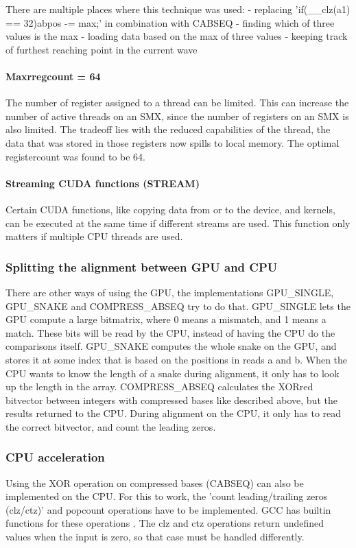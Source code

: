 \documentclass[../main/thesis.tex]{subfiles}
\begin{document}
There are multiple places where this technique was used:
- replacing 'if(\_\_clz(a1) == 32){abpos -= max;}' in combination with CABSEQ
- finding which of three values is the max
- loading data based on the max of three values
- keeping track of furthest reaching point in the current wave

\paragraph{Maxrregcount = 64}
The number of register assigned to a thread can be limited.
This can increase the number of active threads on an SMX, since the number of registers on an SMX is also limited.
The tradeoff lies with the reduced capabilities of the thread, the data that was stored in those registers now spills to local memory.
The optimal registercount was found to be 64.

\paragraph{Streaming CUDA functions (STREAM)}
Certain CUDA functions, like copying data from or to the device, and kernels, can be executed at the same time if different streams are used.
This function only matters if multiple CPU threads are used.

\subsubsection{Splitting the alignment between GPU and CPU}
There are other ways of using the GPU, the implementations GPU\_SINGLE, GPU\_SNAKE and COMPRESS\_ABSEQ try to do that.
GPU\_SINGLE lets the GPU compute a large bitmatrix, where 0 means a mismatch, and 1 means a match.
These bits will be read by the CPU, instead of having the CPU do the comparisons itself.
GPU\_SNAKE computes the whole snake on the GPU, and stores it at some index that is based on the positions in reads a and b.
When the CPU wants to know the length of a snake during alignment, it only has to look up the length in the array.
COMPRESS\_ABSEQ calculates the XORred bitvector between integers with compressed bases like described above, but the results returned to the CPU.
During alignment on the CPU, it only has to read the correct bitvector, and count the leading zeros.

\subsubsection{CPU acceleration}
Using the XOR operation on compressed bases (CABSEQ) can also be implemented on the CPU.
For this to work, the 'count leading/trailing zeros (clz/ctz)' and popcount operations have to be implemented.
GCC has builtin functions for these operations \cite{GCC}.
The clz and ctz operations return undefined values when the input is zero, so that case must be handled differently.
\end{document}
